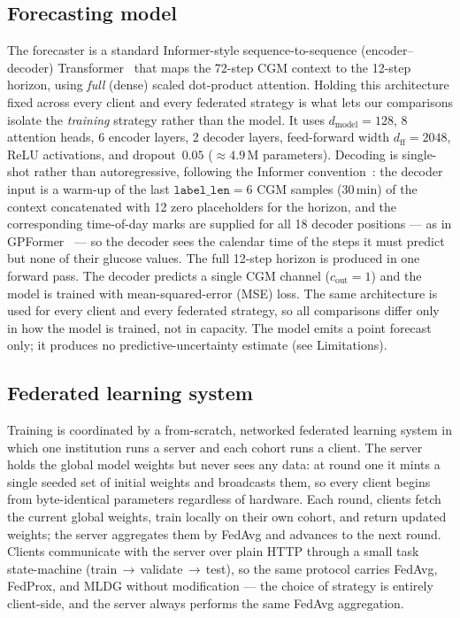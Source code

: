 \documentclass[10pt,letterpaper]{article}
\begin{document}
\subsection*{Forecasting model}

The forecaster is a standard Informer-style sequence-to-sequence
(encoder--decoder) Transformer~\cite{zhou2021informer} that maps
the 72-step CGM context to the 12-step horizon, using \emph{full}
(dense) scaled dot-product attention.
Holding this architecture fixed across every client and every federated
strategy is what lets our comparisons isolate the \emph{training} strategy rather
than the model. It uses
$d_{\text{model}}=128$, 8 attention heads, 6 encoder layers, 2 decoder layers,
feed-forward width $d_{\text{ff}}=2048$, ReLU activations, and dropout~$0.05$
($\approx 4.9$\,M parameters). Decoding is single-shot rather than
autoregressive, following the Informer convention~\cite{zhou2021informer}: the
decoder input is a warm-up of the last $\texttt{label\_len}=6$ CGM samples
(30\,min) of the context concatenated with 12 zero placeholders for the horizon,
and the corresponding time-of-day marks are supplied for all 18 decoder
positions --- as in GPFormer~\cite{zhu2024gpformer} --- so the decoder sees the
calendar time of the steps it must predict but
none of their glucose values. The full 12-step horizon is produced in one forward
pass. The decoder predicts a single CGM channel ($c_{\text{out}}=1$) and the
model is trained with mean-squared-error (MSE) loss. The same architecture is
used for every client and every federated strategy, so all comparisons differ
only in how the model is trained, not in capacity. The model emits a point
forecast only; it produces no predictive-uncertainty estimate (see Limitations).

\subsection*{Federated learning system}

Training is coordinated by a from-scratch, networked federated learning system
in which one institution runs a server and each cohort runs a client. The server
holds the global model weights but never sees any data: at round one it mints a
single seeded set of initial weights and broadcasts them, so every client begins
from byte-identical parameters regardless of hardware. Each round, clients fetch
the current global weights, train locally on their own cohort, and return updated
weights; the server aggregates them by FedAvg and advances to the next round.
Clients communicate with the server over plain HTTP through a small task
state-machine (train\,$\rightarrow$\,validate\,$\rightarrow$\,test), so the same
protocol carries FedAvg, FedProx, and MLDG without modification --- the choice of
strategy is entirely client-side, and the server always performs the same FedAvg
aggregation.
\end{document}
